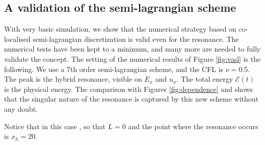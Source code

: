 

\FloatBarrier

\subsection{A validation of the semi-lagrangian scheme}

With very basic simulation, we show that the numerical strategy 
based on co-localised semi-lagrangian discretization is valid even for the resonance.
The numerical tests have been kept to a minimum, and many more are needed to fully validate
the concept.
The setting of the numerical results of Figure \ref{fig:vasl}
is the following. We use a 7th order semi-lagrangian scheme, and the CFL is $\nu=0.5$.
The peak is the hybrid resonance, visible on $E_x$ and $u_x$.
The total energy $\mathcal E(t)$ is the physical energy. 
The comparison with Figures \ref{fig:dependence} and \nrev{\ref{fig:resonance_nus_ex_t}} shows that the 
singular nature of the resonance is captured by this new scheme without any doubt.

Notice that in this case ,
so that $L=0$ and the point where the resonance occurs is $x_h=20$.

